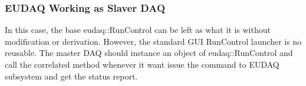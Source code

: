 \subsubsection{EUDAQ Working as Slaver DAQ}
In this case, the base eudaq::RunControl can be left as what it is without modification or derivation. However, the standard GUI RunControl launcher is no reusable. The master DAQ should instance an object
of eudaq::RunControl and call the correlated method whenever it want issue the command to EUDAQ subsystem and get the status report.



